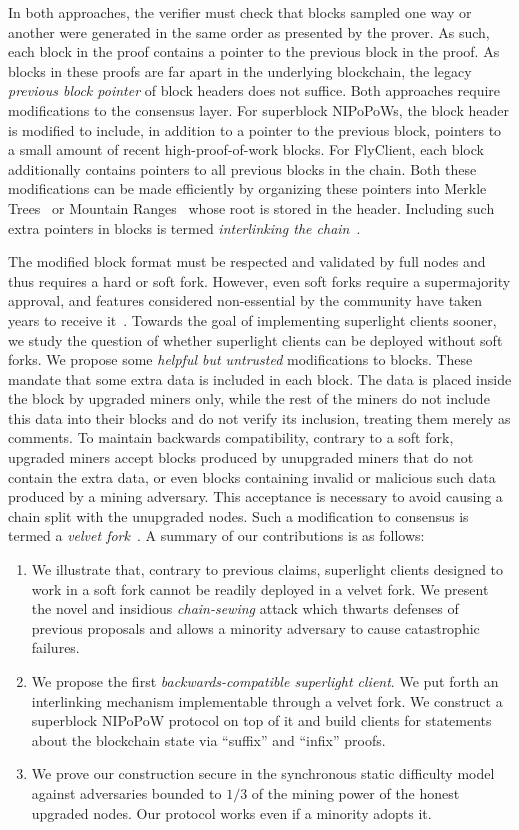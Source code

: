 In both approaches, the verifier must check that blocks
sampled one way or another were generated in the same order as presented by the prover. As such, each block in the proof contains a
pointer to the previous block in the proof. As blocks in these proofs are far
apart in the underlying blockchain, the legacy \emph{previous block pointer}
of block headers does not suffice.
Both approaches require modifications to the consensus layer.
For superblock NIPoPoWs, the block header is
modified to include, in addition to a pointer to the previous block, pointers to
a small amount of recent high-proof-of-work blocks. For FlyClient,
each block additionally contains pointers to all previous blocks in the
chain. Both these modifications can be made efficiently by organizing these
pointers into Merkle Trees~\cite{merkle} or Mountain Ranges~\cite{ct,mmr}
whose root is stored in the header. Including such extra pointers in
blocks is termed \emph{interlinking the chain}~\cite{popow}.

The modified block format must be respected
and validated by full nodes and thus requires a hard or soft fork. However, even soft forks require a supermajority approval, and features considered non-essential by the community have
taken years to receive it~\cite{segwit}. Towards the goal of implementing
superlight clients sooner, we study the question of whether
superlight clients can be deployed without soft forks. We propose some
\emph{helpful but untrusted} modifications to blocks. These
mandate that some extra data is included in each block. The
data is placed inside the block by upgraded miners only, while the rest of the
miners do not include this data into their blocks and do not verify
its inclusion, treating them merely as comments. To maintain backwards
compatibility, contrary to a soft fork, upgraded miners accept blocks
produced by unupgraded miners that
do not contain the extra data, or
even blocks containing invalid or malicious such data produced by a
mining adversary. This acceptance is necessary to avoid causing a chain
split with the unupgraded nodes. Such a modification to
consensus is termed a \emph{velvet fork}~\cite{velvet}.
A summary of our contributions is as follows:
\begin{enumerate}
  \item We illustrate that, contrary to previous claims, superlight
        clients designed to work in a soft fork cannot be readily deployed in a velvet fork. We present the novel and insidious
        \emph{chain-sewing} attack which thwarts defenses of previous proposals and allows a minority adversary to cause
        catastrophic failures.
  \item We propose the first \emph{backwards-compatible superlight client}. We put forth an interlinking mechanism implementable through a velvet fork. We construct a superblock NIPoPoW protocol on top of it and build clients for statements about the blockchain state via ``suffix'' and ``infix'' proofs.
  \item We prove our construction secure in the synchronous static difficulty model against adversaries bounded to $1/3$ of the mining power of the honest upgraded nodes. Our protocol works even if a minority adopts it.
\end{enumerate}

